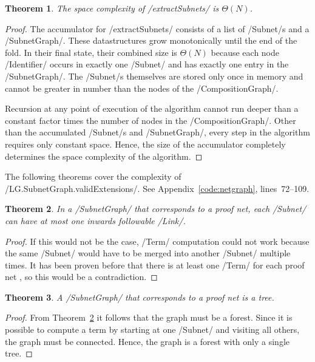 \documentclass[12pt,a4paper]{article}
\newtheorem{theorem}{Theorem}
\begin{document}
\begin{theorem}\label{thm:netgraph-space}
    The space complexity of \hs/extractSubnets/ is $\Theta(N)$.
\end{theorem}
\begin{proof}
    The accumulator for \hs/extractSubnets/ consists of a list of \hs/Subnet/s and a \hs/SubnetGraph/. These datastructures grow monotonically until the end of the fold. In their final state, their combined size is $\Theta(N)$ because each node \hs/Identifier/ occurs in exactly one \hs/Subnet/ and has exactly one entry in the \hs/SubnetGraph/. The \hs/Subnet/s themselves are stored only once in memory and cannot be greater in number than the nodes of the \hs/CompositionGraph/.
    
    Recursion at any point of execution of the algorithm cannot run deeper than a constant factor times the number of nodes in the \hs/CompositionGraph/. Other than the accumulated \hs/Subnet/s and \hs/SubnetGraph/, every step in the algorithm requires only constant space. Hence, the size of the accumulator completely determines the space complexity of the algorithm.
\end{proof}

The following theorems cover the complexity of \hs/LG.SubnetGraph.validExtensions/. See Appendix~\ref{code:netgraph}, lines~72--109.
\begin{theorem}\label{thm:inwards-links}
    In a \hs/SubnetGraph/ that corresponds to a proof net, each \hs/Subnet/ can have at most one inwards followable \hs/Link/.
\end{theorem}
\begin{proof}
    If this would not be the case, \hs/Term/ computation could not work because the same \hs/Subnet/ would have to be merged into another \hs/Subnet/ multiple times. It has been proven before that there is at least one \hs/Term/ for each proof net \cite[p.~11]{mm12}, so this would be a contradiction.
\end{proof}

\begin{theorem}\label{thm:tree}
    A \hs/SubnetGraph/ that corresponds to a proof net is a tree.
\end{theorem}
\begin{proof}
    From Theorem~\ref{thm:inwards-links} it follows that the graph must be a forest. Since it is possible to compute a term by starting at one \hs/Subnet/ and visiting all others, the graph must be connected. Hence, the graph is a forest with only a single tree.
\end{proof}
\end{document}
